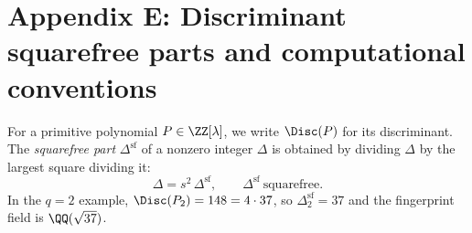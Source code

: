 \section{Appendix E: Discriminant squarefree parts and computational conventions}
\label{app:squarefree}

For a primitive polynomial \(P\in \ZZ[\lambda]\), we write \(\Disc(P)\) for its discriminant. The \emph{squarefree part} \(\Delta^{\mathrm{sf}}\) of a nonzero integer \(\Delta\) is obtained by dividing \(\Delta\) by the largest square dividing it:
\[
\Delta = s^2\,\Delta^{\mathrm{sf}},\qquad \Delta^{\mathrm{sf}}\ \text{squarefree}.
\]
In the \(q=2\) example, \(\Disc(P_2)=148=4\cdot 37\), so \(\Delta_2^{\mathrm{sf}}=37\) and the fingerprint field is \(\QQ(\sqrt{37})\).

